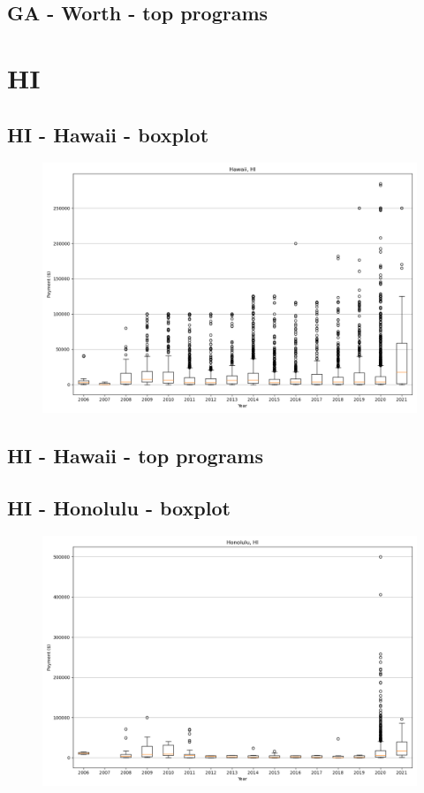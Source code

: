 \subsection*{GA - Worth - top programs}

\newpage
\section*{HI}
\subsection*{HI - Hawaii - boxplot}
\begin{figure}[h]
\centering
\includegraphics[width=7in]{../output/boxplots/counties/Hawaii-HI_boxplot.png}
\end{figure}


\subsection*{HI - Hawaii - top programs}

\newpage
\subsection*{HI - Honolulu - boxplot}
\begin{figure}[h]
\centering
\includegraphics[width=7in]{../output/boxplots/counties/Honolulu-HI_boxplot.png}
\end{figure}


